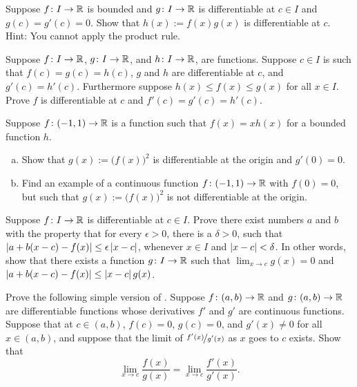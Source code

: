 \begin{exercise} \label{exercise:bndmuldiff}
Suppose $f \colon I \to {\mathbb{R}}$ is bounded and $g \colon I \to
{\mathbb{R}}$ is differentiable at $c \in I$ and $g(c) = g'(c) = 0$.  Show
that $h(x) := f(x) g(x)$ is differentiable at $c$.  Hint: You
cannot apply the product rule.
\end{exercise}

\begin{exercise} \label{exercise:diffsqueeze}
Suppose $f \colon I \to {\mathbb{R}}$, 
$g \colon I \to {\mathbb{R}}$, and
$h \colon I \to {\mathbb{R}}$, are functions.  Suppose $c \in I$ is such that
$f(c) = g(c) = h(c)$, $g$ and $h$ are differentiable at $c$,
and $g'(c) = h'(c)$.  Furthermore suppose $h(x) \leq f(x) \leq g(x)$ for
all $x \in I$.  Prove $f$ is differentiable at $c$ and $f'(c) = g'(c) =
h'(c)$.
\end{exercise}

\begin{exercise}
Suppose $f \colon (-1,1) \to {\mathbb{R}}$ is a function such that $f(x) = x h(x)$ for a bounded
function $h$.
\begin{enumerate}[a)]
\item
Show that $g(x) := {\bigl( f(x) \bigr)}^2$ is
differentiable at the origin and $g'(0) = 0$.
\item
Find an example of a
continuous function $f \colon (-1,1) \to {\mathbb{R}}$ with $f(0) = 0$, but such
that $g(x) := {\bigl( f(x) \bigr)}^2$ is not differentiable at the origin.
\end{enumerate}
\end{exercise}

\begin{exercise}
Suppose $f \colon I \to {\mathbb{R}}$ is differentiable at $c \in I$.
Prove there exist numbers $a$ and $b$ with the property that
for every $\epsilon > 0$, there is a $\delta > 0$, such that
$\left\lvert {a+b(x-c) - f(x)} \right\rvert \leq \epsilon \left\lvert {x-c} \right\rvert$, whenever $x \in I$ and
$\left\lvert {x-c} \right\rvert < \delta$.
In other words, show that
there exists a function $g \colon I \to {\mathbb{R}}$
such that $\lim_{x\to c} g(x) = 0$ and
$\left\lvert {a+b(x-c) - f(x)} \right\rvert \leq \left\lvert {x-c} \right\rvert g(x)$.
\end{exercise}

\begin{exercise} \label{exercise:simpleLHopital}
Prove the following simple version of .
Suppose 
$f \colon (a,b) \to {\mathbb{R}}$ and $g \colon (a,b) \to {\mathbb{R}}$ are differentiable
functions
whose derivatives $f'$ and $g'$ are continuous functions.
Suppose that at $c \in (a,b)$, $f(c) = 0$, $g(c)=0$,
and
$g'(x) \not= 0$ for all $x \in (a,b)$, and suppose
that the limit of $\nicefrac{f'(x)}{g'(x)}$ as $x$ goes to $c$ exists.  Show that
\begin{equation*}
\lim_{x \to c} \frac{f(x)}{g(x)} = 
\lim_{x \to c} \frac{f'(x)}{g'(x)} .
\end{equation*}
\end{exercise}


